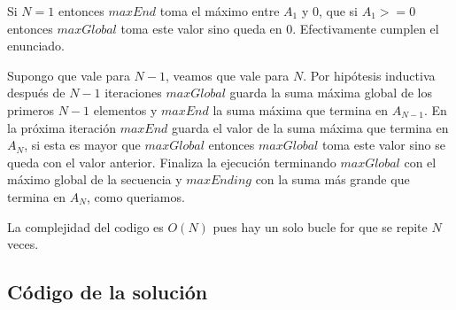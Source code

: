 	Si $N=1$ entonces  $maxEnd$ toma el m\'aximo entre $A_1$ y $0$, que si
	$A_1>=0$ entonces $maxGlobal$ toma este valor sino queda en $0$. 
	Efectivamente cumplen el enunciado.
	
	
	Supongo que vale para $N-1$, veamos que vale para $N$.
	Por hip\'otesis inductiva despu\'es de $N-1$ iteraciones $maxGlobal$
	guarda la suma m\'axima global de los primeros $N-1$ elementos y 
	$maxEnd$ la suma m\'axima que termina en $A_{N-1}$. En la pr\'oxima 
	iteraci\'on $maxEnd$ guarda el valor de la suma m\'axima que termina 
	en $A_N$, si esta es mayor que $maxGlobal$ entonces $maxGlobal$ toma 
	este valor sino se queda con el valor anterior. Finaliza la 
	ejecuci\'on terminando $maxGlobal$ con el m\'aximo global de la 
	secuencia y $maxEnding$ con la suma m\'as grande que termina en 
	$A_N$, como queriamos.


La complejidad del codigo es $O(N)$ pues hay un solo bucle for que se
repite $N$ veces.
\subsection{C\'odigo de la soluci\'on}

